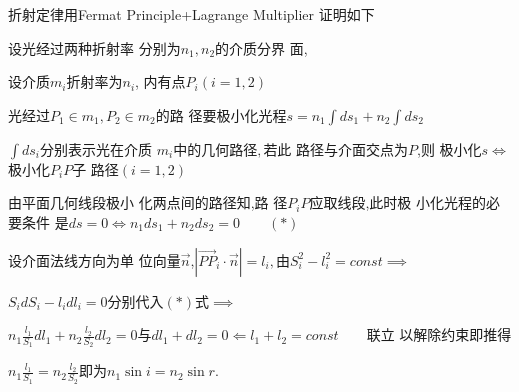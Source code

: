 \documentclass{article}
\begin{document}
折射定律用Fermat Principle+Lagrange Multiplier 
证明如下

设光经过两种折射率%
分别为$n_{1},n_{2}$的介质分界%
面,

设介质$m_{i}$折射率为$n_{i}$,%
内有点$P_{i}\left( i=1,2\right) $

光经过$P_{1}\in m_{1},P_{2}\in m_{2}$的路%
径要极小化光程$s=n_{1}\int
ds_{1}+n_{2}\int ds_{2}$

$\int ds_{i}$分别表示光在介质%
$m_{i}$中的几何路径$,$若此%
路径与介面交点为$P$,则%
极小化$s\iff $极小化$P_{i}P$子%
路径$\left( i=1,2\right) $

由平面几何线段极小%
化两点间的路径知,路%
径$P_{i}P$应取线段,此时极%
小化光程的必要条件%
是$ds=0\iff n_{1}ds_{1}+n_{2}ds_{2}=0\qquad \left( \ast \right) $

设介面法线方向为单%
位向量$\vec{n}$,$\left\vert \overrightarrow{PP}_{i}\cdot 
\vec{n}\right\vert =l_{i},$由$S_{i}^{2}-l_{i}^{2}=const\implies $

$S_{i}dS_{i}-l_{i}dl_{i}=0$分别代入$\left( \ast
\right) $式$\implies $

$n_{1}\frac{l_{1}}{S_{1}}dl_{1}+n_{2}\frac{l_{2}}{S_{2}}dl_{2}=0$与$%
dl_{1}+dl_{2}=0\Longleftarrow l_{1}+l_{2}=const\qquad $联立%
以解除约束即推得

$n_{1}\frac{l_{1}}{S_{1}}=n_{2}\frac{l_{2}}{S_{2}}$即为$%
n_{1}\sin i=n_{2}\sin r.$
\end{document}
